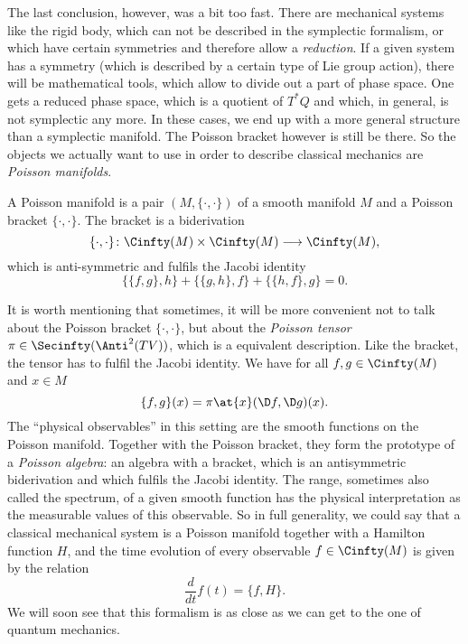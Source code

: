 The last conclusion, however, was a bit too fast. There are mechanical systems 
like the rigid body, which can not be described in the symplectic formalism, 
or which have certain symmetries and therefore allow a \emph{reduction}. If a 
given system has a symmetry (which is described by a certain type of Lie group 
action), there will be mathematical tools, which allow to divide out a part of 
phase space. One gets a reduced phase space, which is a quotient of $T^*Q$ 
and which, in general, is not symplectic any more. In these cases, we end up 
with a more general structure than a symplectic manifold. The Poisson bracket 
however is still be there. So the objects we actually want to use in order to 
describe classical mechanics are \emph{Poisson manifolds}. 
\begin{definition}
	A Poisson manifold is a pair $(M, \{ \cdot, \cdot \})$ of a smooth 
	manifold $M$ and a Poisson bracket $\{ \cdot, \cdot\}$. The bracket is a 
	biderivation
	\begin{equation*}
		\{ \cdot, \cdot \}
		\colon
		\Cinfty(M)
		\times
		\Cinfty(M)
		\longrightarrow
		\Cinfty(M),
	\end{equation*}
	which is anti-symmetric and fulfils the Jacobi identity
	\begin{equation*}
		\{ \{f, g\}, h \}
		+
		\{ \{g, h\}, f \}
		+
		\{ \{h, f\}, g \}
		=
		0.
	\end{equation*}
\end{definition}
It is worth mentioning that sometimes, it will be more convenient not to talk 
about the Poisson bracket $\{\cdot, \cdot\}$, but about the \emph{Poisson tensor} 
$\pi \in \Secinfty(\Anti^2(TV))$, which is a equivalent description. Like the 
bracket, the tensor has to fulfil the Jacobi identity. We have for 
all $f,g \in \Cinfty(M)$ and $x \in M$
\begin{equation*}
	\{f, g\}(x)
	=
	\pi\at{x}(\D f, \D g)(x).
\end{equation*}
The ``physical observables'' in this setting are the smooth functions on the 
Poisson manifold. Together with the Poisson bracket, they form the prototype of a 
\emph{Poisson algebra}: an algebra with a bracket, which is an antisymmetric 
biderivation and which fulfils the Jacobi identity. The range, sometimes also 
called the spectrum, of a given smooth function has the physical interpretation as 
the measurable values of this observable. So in full generality, we could say that 
a classical mechanical system is a Poisson manifold together with a Hamilton 
function $H$, and the time evolution of every observable $f \in \Cinfty(M)$ is 
given by the relation
\begin{equation*}
	\frac{d}{dt} f(t)
	=
	\{f, H\}.
\end{equation*}
We will soon see that this formalism is as close as we can get to the one of 
quantum mechanics.



